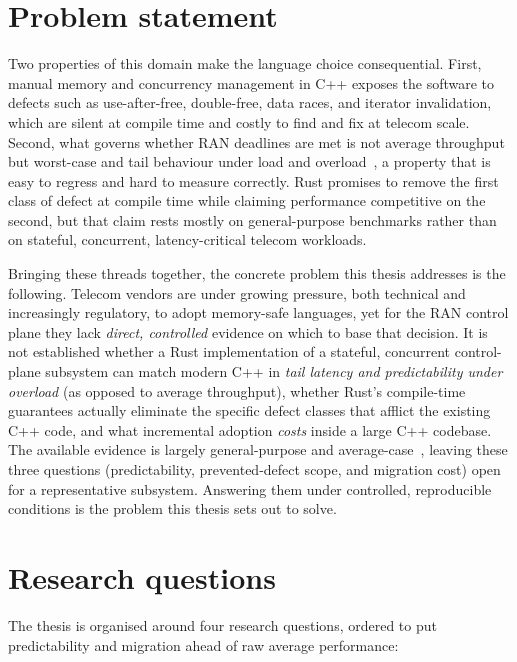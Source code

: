\documentclass[english,twoside,openright,a4paper,censored,csm,software-track-2020]{HYthesisML}
\begin{document}
\section{Problem statement}
Two properties of this domain make the language choice consequential. First, manual memory and
concurrency management in C++ exposes the software to defects such as use-after-free,
double-free, data races, and iterator invalidation, which are silent at compile time and costly
to find and fix at telecom scale. Second, what governs whether RAN deadlines are met is not
average throughput but worst-case and tail behaviour under load and
overload~\cite{dean2013tail}, a property that is easy to regress and hard to measure correctly.
Rust promises to remove the first class of defect at compile time while claiming performance
competitive on the second, but that claim rests mostly on general-purpose benchmarks rather
than on stateful, concurrent, latency-critical telecom workloads.

Bringing these threads together, the concrete problem this thesis addresses is the following.
Telecom vendors are under growing pressure, both technical and increasingly regulatory, to adopt
memory-safe languages, yet for the RAN control plane they lack \emph{direct, controlled}
evidence on which to base that decision. It is not established whether a Rust implementation of
a stateful, concurrent control-plane subsystem can match modern C++ in \emph{tail latency and
predictability under overload} (as opposed to average throughput), whether Rust's compile-time
guarantees actually eliminate the specific defect classes that afflict the existing C++ code,
and what incremental adoption \emph{costs} inside a large C++ codebase. The available evidence
is largely general-purpose and average-case~\cite{balasubramanian2017rust,qin2020rust}, leaving
these three questions (predictability, prevented-defect scope, and migration cost) open for a
representative subsystem. Answering them under controlled, reproducible conditions is the
problem this thesis sets out to solve.

\section{Research questions}
The thesis is organised around four research questions, ordered to put predictability and
migration ahead of raw average performance:
\end{document}
